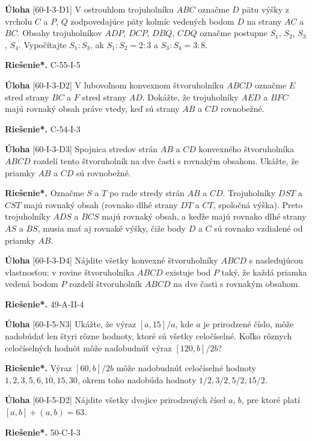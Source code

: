 \documentclass{article}
\newcommand{\rieh}{\textbf{Riešenie*.} }
\newcommand{\problem}[3]{
  \begin{tcolorbox}[breakable,notitle,boxrule=0pt,colback=light-gray,colframe=light-gray]
    \textbf{Úloha}
    [#1] #2
  \end{tcolorbox}
  \noindent#3
}
\begin{document}
\problem{60-I-3-D1}{
V ostrouhlom trojuholníku $ABC$ označme $D$ pätu výšky z vrcholu $C$ a $P$, $Q$ zodpovedajúce päty kolmíc vedených bodom $D$ na strany $AC$ a $BC$. Obsahy trojuholníkov $ADP$, $DCP$, $DBQ$, $CDQ$ označme postupne $S_1$, $S_2$, $S_3$, $S_4$. Vypočítajte $S_1 : S_3$, ak $S_1 : S_2 = 2 : 3$ a $S_3 : S_4 = 3 : 8$.
}{
\rieh C-55-I-5
}

\problem{60-I-3-D2}{
V ľubovoľnom konvexnom štvoruholníku $ABCD$ označme $E$ stred strany $BC$ a $F$ stred strany $AD$. Dokážte, že trojuholníky $AED$ a $BFC$ majú rovnaký obsah práve vtedy, keď sú strany $AB$ a $CD$ rovnobežné.
}
{\rieh C-54-I-3}


\problem{60-I-3-D3}{
Spojnica stredov strán $AB$ a $CD$ konvexného štvoruholníka $ABCD$ rozdelí tento štvoruholník na dve časti s rovnakým obsahom. Ukážte, že priamky $AB$ a $CD$ sú rovnobežné.
}{
\rieh Označme $S$ a $T$ po rade stredy strán $AB$ a $CD$. Trojuholníky $DST$ a $CST$ majú rovnaký obsah (rovnako dlhé strany $DT$ a $CT$, spoločná výška). Preto trojuholníky $ADS$ a $BCS$ majú rovnaký obsah, a keďže majú rovnako dlhé strany $AS$ a $BS$, musia mať aj rovnaké výšky, čiže body $D$ a $C$ sú rovnako vzdialené od priamky $AB$.
}


\problem{60-I-3-D4}{
Nájdite všetky konvexné štvoruholníky $ABCD$ s nasledujúcou vlastnosťou: v rovine štvoruholníka $ABCD$ existuje bod $P$ taký, že každá priamka vedená bodom $P$ rozdelí štvoruholník $ABCD$ na dve časti s rovnakým obsahom.
}{
\rieh 49-A-II-4
}


\problem{60-I-5-N3}{
Ukážte, že výraz $[a, 15]/a$, kde $a$ je prirodzené číslo, môže nadobúdať len štyri rôzne hodnoty, ktoré sú všetky celočíselné. Koľko rôznych celočíselných hodnôt môže nadobudnúť výraz $[120, b]/2b$? 
}{
\rieh Výraz $[60, b]/2b$ môže nadobudnúť celočíselné hodnoty $1, 2,3, 5, 6, 10, 15, 30$, okrem toho nadobúda hodnoty $1/2, 3/2, 5/2, 15/2$.
}



\problem{60-I-5-D2}{
Nájdite všetky dvojice prirodzených čísel $a$, $b$, pre ktoré platí $[a, b] + (a, b) = 63$.
}{
\rieh 50-C-I-3
}
\end{document}
